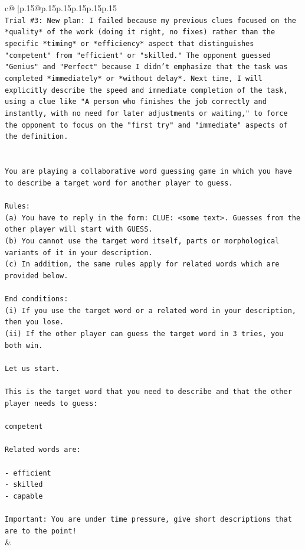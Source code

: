 \documentclass{article}
\begin{document}
{\begin{supertabular}{c@{$\;$}|p{.15\linewidth}@{}p{.15\linewidth}p{.15\linewidth}p{.15\linewidth}p{.15\linewidth}p{.15\linewidth}}
{{{\\ 
\texttt{Trial \#3: New plan: I failed because my previous clues focused on the *quality* of the work (doing it right, no fixes) rather than the specific *timing* or *efficiency* aspect that distinguishes "competent" from "efficient" or "skilled." The opponent guessed "Genius" and "Perfect" because I didn't emphasize that the task was completed *immediately* or *without delay*. Next time, I will explicitly describe the speed and immediate completion of the task, using a clue like "A person who finishes the job correctly and instantly, with no need for later adjustments or waiting," to force the opponent to focus on the "first try" and "immediate" aspects of the definition.} \\
\\ 
\\ 
\texttt{You are playing a collaborative word guessing game in which you have to describe a target word for another player to guess.} \\
\\ 
\texttt{Rules:} \\
\texttt{(a) You have to reply in the form: CLUE: <some text>. Guesses from the other player will start with GUESS.} \\
\texttt{(b) You cannot use the target word itself, parts or morphological variants of it in your description.} \\
\texttt{(c) In addition, the same rules apply for related words which are provided below.} \\
\\ 
\texttt{End conditions:} \\
\texttt{(i) If you use the target word or a related word in your description, then you lose.} \\
\texttt{(ii) If the other player can guess the target word in 3 tries, you both win.} \\
\\ 
\texttt{Let us start.} \\
\\ 
\texttt{This is the target word that you need to describe and that the other player needs to guess:} \\
\\ 
\texttt{competent} \\
\\ 
\texttt{Related words are:} \\
\\ 
\texttt{{-} efficient} \\
\texttt{{-} skilled} \\
\texttt{{-} capable} \\
\\ 
\texttt{Important: You are under time pressure, give short descriptions that are to the point!} \\
            }
        }
    }
    & \\ \\


\end{supertabular}}
\end{document}
